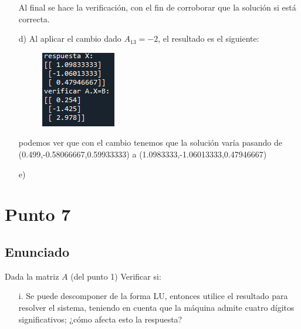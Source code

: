 \documentclass[10pt,letterpaper]{article}
\begin{document}
\begin{center}
\begin{enumerate}
\begin{figure}[H]
				\centering
			\end{figure}
			Al final se hace la verificación, con el fin de corroborar que la solución si está correcta.
			\item[d)] Al aplicar el cambio dado $A_{13}=-2$, el resultado es el siguiente:\\
			\begin{figure}[H]
				\includegraphics{imagen5}
				\centering
			\end{figure}
			podemos ver que con el cambio tenemos que la solución varía pasando de (0.499,-0.58066667,0.59933333) a (1.0983333,-1.06013333,0.47946667)
			\item[e)]
		\end{enumerate}
		
	\end{center}		
\section{Punto 7}
	
	\subsection{Enunciado}
	Dada la matriz $A$ (del punto 1) Verificar si:
	\begin{enumerate}
		\item[i.] Se puede descomponer de la forma LU, entonces utilice el resultado para resolver el sistema, teniendo en cuenta que la máquina admite cuatro dígitos significativos; ¿cómo afecta esto la respuesta?
	\end{enumerate}
	
\end{document}
